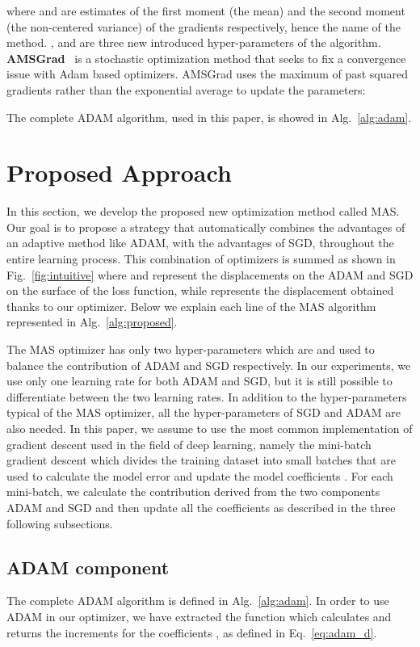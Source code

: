 \documentclass[10pt,twocolumn,letterpaper]{article}
\begin{document}
where  and  are estimates of the first moment (the mean) and the second moment (the non-centered variance) of the gradients respectively, hence the name of the method.
,  and  are three new introduced hyper-parameters of the algorithm.
\textbf{AMSGrad}~\cite{chen2018closing} is a stochastic optimization method that seeks to fix a convergence issue with Adam based optimizers. 
AMSGrad uses the maximum of past squared gradients  rather than the exponential average to update the parameters:



The complete ADAM algorithm, used in this paper, is showed in Alg.~\ref{alg:adam}.


\section{Proposed Approach}
In this section, we develop the proposed new optimization method called MAS. 
Our goal is to propose a strategy that automatically combines the advantages of an adaptive method like ADAM, with the advantages of SGD, throughout the entire learning process. 
This combination of optimizers is summed as shown in Fig.~\ref{fig:intuitive} where  and  represent the displacements on the ADAM and SGD on the surface of the loss function, while  represents the displacement obtained thanks to our optimizer.
Below we explain each line of the MAS algorithm represented in Alg.~\ref{alg:proposed}.

The MAS optimizer has only two hyper-parameters which are  and  used to balance the contribution of ADAM and SGD respectively.
In our experiments, we use only one learning rate  for both ADAM and SGD, but it is still possible to differentiate between the two learning rates.
In addition to the hyper-parameters typical of the  MAS optimizer, all the hyper-parameters of SGD and ADAM are also needed.
In this paper, we assume to use the most common implementation of gradient descent used in the field of deep learning, namely the mini-batch gradient descent which divides the training dataset into small batches that are used to calculate the model error and update the model coefficients .
For each mini-batch, we calculate the contribution derived from the two components ADAM and SGD and then update all the coefficients as described in the three following subsections.

\subsection{ADAM component}
The complete ADAM algorithm is defined in Alg.~\ref{alg:adam}.
In order to use ADAM in our optimizer, we have extracted the  function which calculates and returns the increments  for the coefficients , as defined in Eq.~\ref{eq:adam_d}. 
\end{document}
